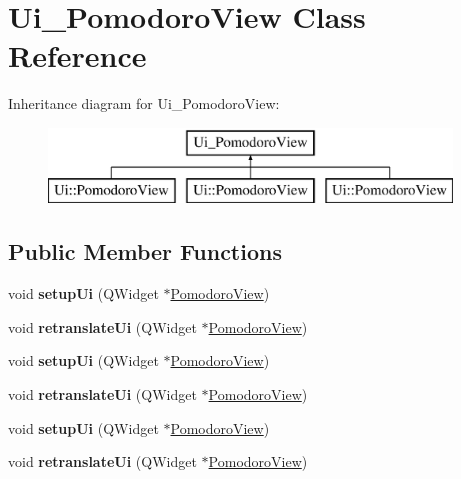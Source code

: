 \hypertarget{class_ui___pomodoro_view}{}\section{Ui\+\_\+\+Pomodoro\+View Class Reference}
\label{class_ui___pomodoro_view}
Inheritance diagram for Ui\+\_\+\+Pomodoro\+View\+:\begin{figure}[H]
\begin{center}
\leavevmode
\includegraphics[height=2.000000cm]{class_ui___pomodoro_view}
\end{center}
\end{figure}
\subsection*{Public Member Functions}
\begin{DoxyCompactItemize}
\item 
\mbox{\label{class_ui___pomodoro_view_ac32ca76a964942290e48988fe6f9eef3}} 
void {\bfseries setup\+Ui} (Q\+Widget $\ast$\hyperlink{class_pomodoro_view}{Pomodoro\+View})
\item 
\mbox{\label{class_ui___pomodoro_view_a3e4d7f8112dc218a333c71ff196d05ab}} 
void {\bfseries retranslate\+Ui} (Q\+Widget $\ast$\hyperlink{class_pomodoro_view}{Pomodoro\+View})
\item 
\mbox{\label{class_ui___pomodoro_view_ac32ca76a964942290e48988fe6f9eef3}} 
void {\bfseries setup\+Ui} (Q\+Widget $\ast$\hyperlink{class_pomodoro_view}{Pomodoro\+View})
\item 
\mbox{\label{class_ui___pomodoro_view_a3e4d7f8112dc218a333c71ff196d05ab}} 
void {\bfseries retranslate\+Ui} (Q\+Widget $\ast$\hyperlink{class_pomodoro_view}{Pomodoro\+View})
\item 
\mbox{\label{class_ui___pomodoro_view_ac32ca76a964942290e48988fe6f9eef3}} 
void {\bfseries setup\+Ui} (Q\+Widget $\ast$\hyperlink{class_pomodoro_view}{Pomodoro\+View})
\item 
\mbox{\label{class_ui___pomodoro_view_a3e4d7f8112dc218a333c71ff196d05ab}} 
void {\bfseries retranslate\+Ui} (Q\+Widget $\ast$\hyperlink{class_pomodoro_view}{Pomodoro\+View})
\end{DoxyCompactItemize}
